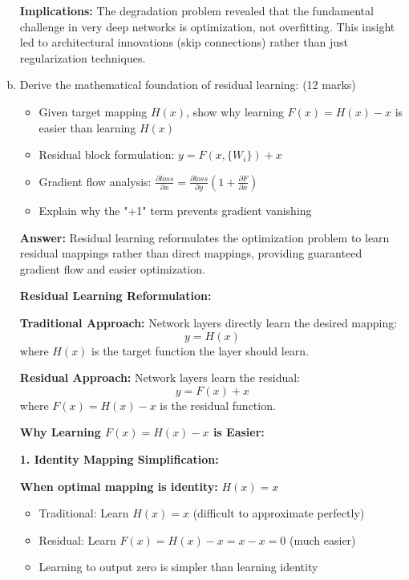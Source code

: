 \documentclass[12pt]{article}
\newcommand{\answer}[1]{{\color{answercolor}\textbf{Answer:} #1}}
\newcommand{\explanation}[1]{{\color{explanationcolor}#1}}
\begin{document}
\begin{enumerate}[(a)]
{    \textbf{Implications:}
    The degradation problem revealed that the fundamental challenge in very deep networks is optimization, not overfitting. This insight led to architectural innovations (skip connections) rather than just regularization techniques.
    }
    
    \item Derive the mathematical foundation of residual learning: \hfill (12 marks)
    \begin{itemize}
        \item Given target mapping $H(x)$, show why learning $F(x) = H(x) - x$ is easier than learning $H(x)$
        \item Residual block formulation: $y = F(x, \{W_i\}) + x$
        \item Gradient flow analysis: $\frac{\partial loss}{\partial x} = \frac{\partial loss}{\partial y}(1 + \frac{\partial F}{\partial x})$
        \item Explain why the "+1" term prevents gradient vanishing
    \end{itemize}
    
    \answer{Residual learning reformulates the optimization problem to learn residual mappings rather than direct mappings, providing guaranteed gradient flow and easier optimization.}
    
    \explanation{
    \textbf{Residual Learning Reformulation:}
    
    \textbf{Traditional Approach:}
    Network layers directly learn the desired mapping:
    $$y = H(x)$$
    where $H(x)$ is the target function the layer should learn.
    
    \textbf{Residual Approach:}
    Network layers learn the residual:
    $$y = F(x) + x$$
    where $F(x) = H(x) - x$ is the residual function.
    
    \textbf{Why Learning $F(x) = H(x) - x$ is Easier:}
    
    \textbf{1. Identity Mapping Simplification:}
    
    \textbf{When optimal mapping is identity:} $H(x) = x$
    \begin{itemize}
        \item Traditional: Learn $H(x) = x$ (difficult to approximate perfectly)
        \item Residual: Learn $F(x) = H(x) - x = x - x = 0$ (much easier)
        \item Learning to output zero is simpler than learning identity
    \end{itemize}
    
}
\end{enumerate}
\end{document}
